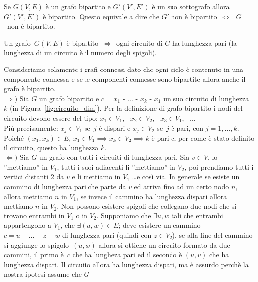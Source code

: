 \begin{prop}
Se $G(V,E)$ è un grafo bipartito e $G'(V',E')$ è un suo sottografo allora
$G'(V',E')$ è bipartito.
Questo equivale a dire che $G'$ non è bipartito~$\iff \text{ } G$~non è bipartito. 
\end{prop}

\begin{thm}
Un grafo~$G(V,E)$ è bipartito~$\iff$~ogni circuito di $G$ ha lunghezza pari
(la lunghezza di un circuito è il numero degli spigoli).
\end{thm}
\proof
Consideriamo solamente i grafi connessi dato che ogni ciclo è contenuto in una componente
connessa e se le componenti connesse sono bipartite allora anche il grafo è bipartito.\\
$\Longrightarrow)$ Sia $G$ un grafo bipartito e ${c = x_1\text{ - }\dots\text{ - }x_k\text{ - }x_1}$
un suo circuito di lunghezza $k$ (in Figura~\ref{fig:circuito_dim}).
Per la definizione di grafo bipartito i nodi del circuito devono essere del tipo:
${x_1 \in V_1,}\text{ }{x_2 \in V_2,}\text{ }{x_3 \in V_1,\text{ }\dots}$\\ 
Più precisamente: ${x_j \in V_1}$ se~$j$ è dispari e ${x_j \in V_2}$ se~$j$ è pari, con
${j = 1,\dots,k}$.\\
Poiché ${(x_1, x_k) \in E} \text{, } {x_1 \in V_1 \implies x_k \in V_2 \implies k}$ è pari
e, per come è stato definito il circuito, questo ha lunghezza $k$.\\
$\Longleftarrow)$ Sia $G$ un grafo con tutti i circuiti di lunghezza pari. Sia $v \in V$,
lo ''mettiamo'' in $V_1$, tutti i suoi adiacenti li ''mettiamo'' in $V_2$, poi prendiamo
tutti i vertici distanti 2 da $v$ e li mettiamo in $V_1$ \dots e così via.
In generale se esiste un cammino di lunghezza pari che parte da $v$ ed arriva fino ad un certo
nodo $n$, allora mettiamo $n$ in $V_1$, se invece il cammino ha lunghezza dispari allora
mettiamo $n$ in $V_2$.
Non possono esistere spigoli che collegano due nodi che si trovano entrambi in $V_1$ o in $V_2$.
Supponiamo che $\exists u,w$ tali che entrambi appartengono a $V_1$, che ${\exists (u,w) \in E}$;
deve esistere un cammino ${c = u - \dots - z - w}$ di lunghezza pari (quindi con ${z \in V_2}$),
se alla fine del cammino si aggiunge lo spigolo~$(u,w)$ allora si ottiene un circuito formato da
due cammini, il primo è~$c$ che ha lungheza pari ed il secondo è $(u,v)$ che ha lunghezza dispari.
Il circuito allora ha lunghezza dispari, ma è assurdo perchè la nostra ipotesi assume che $G$ 
